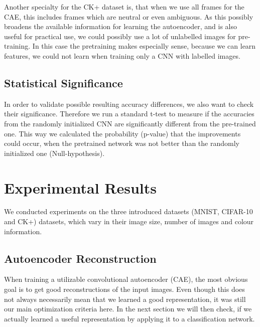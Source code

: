 \documentclass{article}
\begin{document}
      Another specialty for the CK+ dataset is, that when we use all frames for the CAE, this includes frames which are neutral or even ambiguous.
      As this possibly broadens the available information for learning the autoencoder, and is also useful for practical use, we could possibly use a lot of unlabelled images for pre-training.
      In this case the pretraining makes especially sense, because we can learn features, we could not learn when training only a CNN with labelled images.

  \subsection{Statistical Significance}
      In order to validate possible resulting accuracy differences, we also want to check their significance.
      Therefore we run a standard t-test to measure if the accuracies from the randomly initialized CNN are significantly different from the pre-trained one.
      This way we calculated the probability (p-value) that the improvements could occur, when the pretrained network was not better than the randomly initialized one (Null-hypothesis).


\section{Experimental Results}
  We conducted experiments on the three introduced datasets (MNIST, CIFAR-10 and CK+) datasets, which vary in their image size, number of images and colour information.
  
  \subsection{Autoencoder Reconstruction}

    When training a utilizable convolutional autoencoder (CAE), the most obvious goal is to get good reconstructions of the input images.
    Even though this does not always necessarily mean that we learned a good representation, it was still our main optimization criteria here.
    In the next section we will then check, if we actually learned a useful representation by applying it to a classification network.
\end{document}
